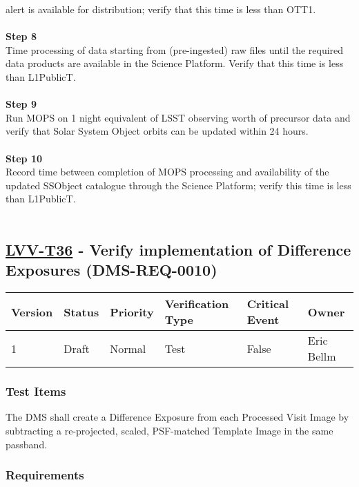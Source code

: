 alert is available for distribution; verify that this time is less than
OTT1.\\
~\\
\textbf{Step 8}\\
Time processing of data starting from (pre-ingested) raw files until the
required data products are available in the Science Platform. Verify
that this time is less than L1PublicT.\\
~\\
\textbf{Step 9}\\
Run MOPS on 1 night equivalent of LSST observing worth of precursor data
and verify that Solar System Object orbits can be updated within 24
hours.\\
~\\
\textbf{Step 10}\\
Record time between completion of MOPS processing and availability of
the updated SSObject catalogue through the Science Platform; verify this
time is less than L1PublicT.\\
~\\

\hypertarget{lvv-t36---verify-implementation-of-difference-exposures-dms-req-0010}{%
\subsection{\texorpdfstring{\href{https://jira.lsstcorp.org/secure/Tests.jspa\#/testCase/LVV-T36}{LVV-T36}
- Verify implementation of Difference Exposures
(DMS-REQ-0010)}{LVV-T36 - Verify implementation of Difference Exposures (DMS-REQ-0010)}}\label{lvv-t36---verify-implementation-of-difference-exposures-dms-req-0010}}

\begin{longtable}[]{@{}llllll@{}}
\toprule
Version & Status & Priority & Verification Type & Critical Event &
Owner\tabularnewline
\midrule
\endhead
1 & Draft & Normal & Test & False & Eric Bellm\tabularnewline
\bottomrule
\end{longtable}

\hypertarget{test-items-12}{%
\subsubsection{Test Items}\label{test-items-12}}

The DMS shall create a Difference Exposure from each Processed Visit
Image by subtracting a re-projected, scaled, PSF-matched Template Image
in the same passband.

\hypertarget{requirements-13}{%
\subsubsection{Requirements}\label{requirements-13}}

